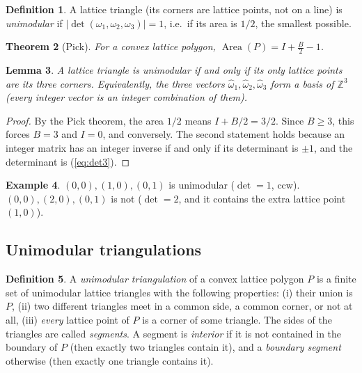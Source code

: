 \documentclass[11pt]{article}
\theoremstyle{plain}
\newtheorem{theorem}{Theorem}[section]
\newtheorem{lemma}[theorem]{Lemma}
\theoremstyle{definition}
\newtheorem{definition}[theorem]{Definition}
\newtheorem{example}[theorem]{Example}
\theoremstyle{remark}
\newcommand{\Z}{\mathbb{Z}}
\newcommand{\hatw}{\widehat{\omega}}
\begin{document}
\begin{definition}
A lattice triangle (its corners are lattice points, not on a line) is
\textit{unimodular} if $|\det(\omega_1,\omega_2,\omega_3)|=1$, i.e.\ if its area is $1/2$, the
smallest possible.
\end{definition}

\begin{theorem}[Pick]
For a convex lattice polygon, $\operatorname{Area}(P)=I+\tfrac{B}{2}-1$.
\end{theorem}

\begin{lemma}\label{lem:unimodular}
A lattice triangle is unimodular if and only if its only lattice points are its three corners.
Equivalently, the three vectors $\hatw_1,\hatw_2,\hatw_3$ form a basis of $\Z^3$ (every integer
vector is an integer combination of them).
\end{lemma}
\begin{proof}
By the Pick theorem, the area $1/2$ means $I+B/2=3/2$. Since $B\ge3$, this forces $B=3$ and
$I=0$, and conversely.
The second statement holds because an integer matrix has an integer inverse if and only if its determinant
is $\pm1$, and the determinant is (\ref{eq:det3}).
\end{proof}

\begin{example}
$(0,0),(1,0),(0,1)$ is unimodular ($\det=1$, ccw). $(0,0),(2,0),(0,1)$ is not ($\det=2$, and it
contains the extra lattice point $(1,0)$).
\end{example}

\subsection{Unimodular triangulations}

\begin{definition}
A \textit{unimodular triangulation} of a convex lattice polygon $P$ is a finite set of unimodular
lattice triangles with the following properties: (i) their union is $P$, (ii) two different
triangles meet in a common side, a common corner, or not at all, (iii) \textit{every} lattice
point of $P$ is a corner of some triangle. The sides of the triangles are called
\textit{segments}. A segment is \textit{interior} if
it is not contained in the boundary of $P$ (then exactly two triangles contain it), and a
\textit{boundary segment} otherwise (then exactly one triangle contains it).
\end{definition}
\end{document}
